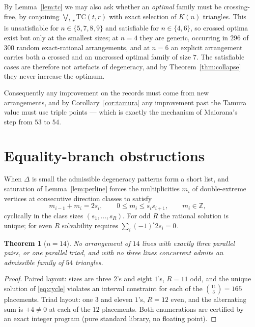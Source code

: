\documentclass[11pt]{article}
\newtheorem{theorem}{Theorem}
\theoremstyle{definition}
\begin{document}
By Lemma~\ref{lem:tc} we may also ask whether an \emph{optimal} family must
be crossing-free, by conjoining $\bigvee_{t,r}\mathrm{TC}(t,r)$ with exact
selection of $K(n)$ triangles. This is unsatisfiable for
$n\in\{5,7,8,9\}$ and satisfiable for $n\in\{4,6\}$, so crossed optima exist
but only at the smallest sizes; at $n=4$ they are generic, occurring in
$296$ of $300$ random exact-rational arrangements, and at $n=6$ an explicit
arrangement carries both a crossed and an uncrossed optimal family of size
$7$. The satisfiable cases are therefore not artefacts of degeneracy, and by
Theorem~\ref{thm:collapse} they never increase the optimum.

Consequently any improvement on the records must come from new arrangements,
and by Corollary~\ref{cor:tamura} any improvement past the Tamura value must
use triple points --- which is exactly the mechanism of Maiorana's step from
$53$ to $54$.

\section{Equality-branch obstructions}

When $\Delta$ is small the admissible degeneracy patterns form a short list,
and saturation of Lemma~\ref{lem:perline} forces the multiplicities $m_i$ of
double-extreme vertices at consecutive direction classes to satisfy
\begin{equation}\label{eq:cycle}
 m_{i-1}+m_i=2s_i,\qquad 0\le m_i\le s_is_{i+1},\qquad m_i\in\mathbb Z,
\end{equation}
cyclically in the class sizes $(s_1,\dots,s_R)$. For odd $R$ the rational
solution is unique; for even $R$ solvability requires
$\sum_i(-1)^i 2s_i=0$.

\begin{theorem}[$n=14$]\label{thm:M}
No arrangement of $14$ lines with exactly three parallel pairs, or one
parallel triad, and with no three lines concurrent admits an admissible
family of $54$ triangles.
\end{theorem}

\begin{proof}
Paired layout: sizes are three $2$'s and eight $1$'s, $R=11$ odd, and the
unique solution of \eqref{eq:cycle} violates an interval constraint for each
of the $\binom{11}{3}=165$ placements. Triad layout: one $3$ and eleven
$1$'s, $R=12$ even, and the alternating sum is $\pm4\ne0$ at each of the $12$
placements. Both enumerations are certified by an exact integer program
(pure standard library, no floating point).
\end{proof}
\end{document}
